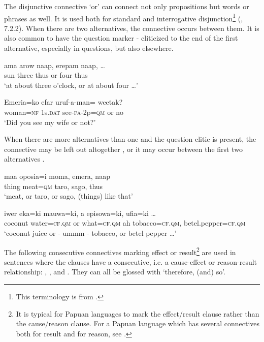 The disjunctive connective  `or' can connect not only propositions but words or phrases as well. It is used both for standard  and interrogative  disjunction\footnote{This terminology is from \citet{Haspelmath2007}.} (, 7.2.2). When there are two alternatives, the connective occurs between them. It is also common to have the question marker - cliticized to the end of the first alternative, especially in questions, but also elsewhere.

\ea%
\label{ex:3:x724}
\gll ama arow naap,  erepam naap, {\dots} \\
sun three thus or four thus \\
\glt`at about three o'clock, or at about four {\dots}'
\z

\ea%
\label{ex:3:x725}
\gll Emeria=ko efar uruf-a-man=  weetak? \\
woman=\textsc{nf} 1s.\textsc{dat} see-\textsc{pa}-2p=\textsc{qm} or no\\
\glt`Did you see my wife or not?'
\z

When there are more alternatives than one and the question clitic is present, the connective may be left out altogether , or it may occur between the first two alternatives . 

\ea%
\label{ex:3:x726}
\gll maa oposia=i moma, emera, naap \\
thing meat=\textsc{qm} taro, sago, thus\\
\glt`meat, or taro, or sago, (things) like that'
\z

\ea%
\label{ex:3:x727}
\gll iwer eka=ki  mauwa=ki, a episowa=ki, ufia=ki {\dots}\\
coconut water=\textsc{cf}.\textsc{qm} or what=\textsc{cf}.\textsc{qm} ah tobacco=\textsc{cf}.\textsc{qm}, betel.pepper=\textsc{cf}.\textsc{qm}\\
\glt`coconut juice or - ummm - tobacco, or betel pepper {\dots}'
\z

The following consecutive connectives marking effect or result\footnote{It is typical for Papuan languages to mark the effect/result clause rather than the cause/reason clause. For a Papuan language which has several connectives both for result and for reason, see \citet[267--273]{Farr1999}.} are used in sentences where the clauses have a consecutive, i.e. a cause-effect or reason-result relationship: , , and . They can all be glossed with `therefore, (and) so'.

